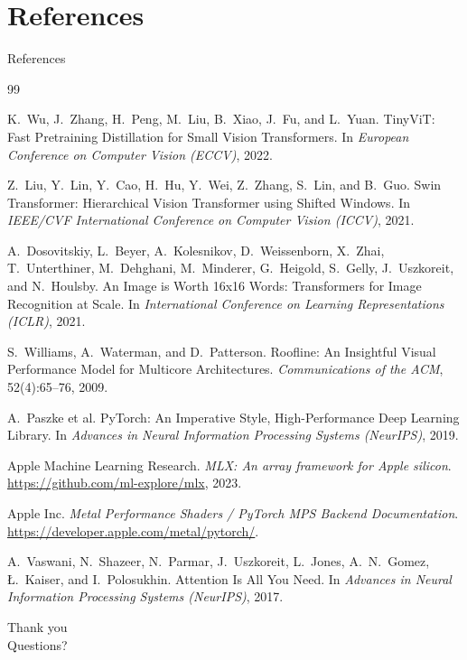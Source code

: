 \documentclass[aspectratio=169]{beamer}
\begin{document}
\section{References}

\begin{frame}[allowframebreaks]{References}
  \small
  \begin{thebibliography}{99}

    K.~Wu, J.~Zhang, H.~Peng, M.~Liu, B.~Xiao, J.~Fu, and L.~Yuan.
    \newblock TinyViT: Fast Pretraining Distillation for Small Vision Transformers.
    \newblock In \emph{European Conference on Computer Vision (ECCV)}, 2022.

    Z.~Liu, Y.~Lin, Y.~Cao, H.~Hu, Y.~Wei, Z.~Zhang, S.~Lin, and B.~Guo.
    \newblock Swin Transformer: Hierarchical Vision Transformer using Shifted Windows.
    \newblock In \emph{IEEE/CVF International Conference on Computer Vision (ICCV)}, 2021.

    A.~Dosovitskiy, L.~Beyer, A.~Kolesnikov, D.~Weissenborn, X.~Zhai, T.~Unterthiner,
    M.~Dehghani, M.~Minderer, G.~Heigold, S.~Gelly, J.~Uszkoreit, and N.~Houlsby.
    \newblock An Image is Worth 16x16 Words: Transformers for Image Recognition at Scale.
    \newblock In \emph{International Conference on Learning Representations (ICLR)}, 2021.

    S.~Williams, A.~Waterman, and D.~Patterson.
    \newblock Roofline: An Insightful Visual Performance Model for Multicore Architectures.
    \newblock \emph{Communications of the ACM}, 52(4):65--76, 2009.

    A.~Paszke et al.
    \newblock PyTorch: An Imperative Style, High-Performance Deep Learning Library.
    \newblock In \emph{Advances in Neural Information Processing Systems (NeurIPS)}, 2019.

    Apple Machine Learning Research.
    \newblock \emph{MLX: An array framework for Apple silicon}.
    \newblock \url{https://github.com/ml-explore/mlx}, 2023.

    Apple Inc.
    \newblock \emph{Metal Performance Shaders / PyTorch MPS Backend Documentation}.
    \newblock \url{https://developer.apple.com/metal/pytorch/}.

    A.~Vaswani, N.~Shazeer, N.~Parmar, J.~Uszkoreit, L.~Jones, A.~N.~Gomez, {\L}.~Kaiser, and
    I.~Polosukhin.
    \newblock Attention Is All You Need.
    \newblock In \emph{Advances in Neural Information Processing Systems (NeurIPS)}, 2017.

  \end{thebibliography}
\end{frame}

\begin{frame}
  \centering
  \Huge Thank you
  \\[4mm]
  \Large Questions?
\end{frame}
\end{document}
